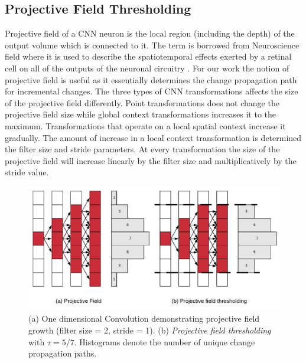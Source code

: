 \subsection{Projective Field Thresholding}

Projective field \cite{le2017receptive, basiccnnoperations} of a CNN neuron is the local region (including the depth) of the output volume which is connected to it.
The term is borrowed from Neuroscience field where it is used to describe the spatiotemporal effects exerted by a retinal cell on all of the outputs of the neuronal circuitry \cite{de2011projective}.
For our work the notion of projective field is useful as it essentially determines the change propagation path for incremental changes.
The three types of CNN transformations affects the size of the projective field differently. Point transformations does not change the projective field size while global context transformations increases it to the maximum. Transformations that operate on a local spatial context increase it gradually.
The amount of increase in a local context transformation is determined the filter size and stride parameters. At every transformation the size of the projective field will increase linearly by the filter size and multiplicatively by the stride value.

\begin{figure}[t]
\includegraphics[width=\columnwidth]{images/pf_truncate}
\caption{(a) One dimensional Convolution demonstrating projective field growth (filter size = 2, stride = 1). (b) \textit{Projective field thresholding} with $\tau = 5/7$. Histograms denote the number of unique change propagation paths.}
\label{fig:pf_truncate}
\end{figure}

